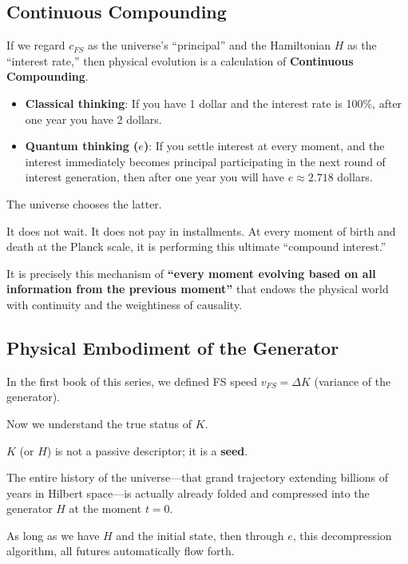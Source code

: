 \subsection{Continuous Compounding}

If we regard $c_{FS}$ as the universe's ``principal'' and the Hamiltonian $H$ as the ``interest rate,'' then physical evolution is a calculation of \textbf{Continuous Compounding}.

\begin{itemize}
\item \textbf{Classical thinking}: If you have 1 dollar and the interest rate is 100\%, after one year you have 2 dollars.

\item \textbf{Quantum thinking ($e$)}: If you settle interest at every moment, and the interest immediately becomes principal participating in the next round of interest generation, then after one year you will have $e \approx 2.718$ dollars.
\end{itemize}

The universe chooses the latter.

It does not wait. It does not pay in installments. At every moment of birth and death at the Planck scale, it is performing this ultimate ``compound interest.''

It is precisely this mechanism of \textbf{``every moment evolving based on all information from the previous moment''} that endows the physical world with continuity and the weightiness of causality.

\subsection{Physical Embodiment of the Generator}

In the first book of this series, we defined FS speed $v_{FS} = \Delta K$ (variance of the generator).

Now we understand the true status of $K$.

$K$ (or $H$) is not a passive descriptor; it is a \textbf{seed}.

The entire history of the universe---that grand trajectory extending billions of years in Hilbert space---is actually already folded and compressed into the generator $H$ at the moment $t=0$.

As long as we have $H$ and the initial state, then through \textbf{$e$}, this decompression algorithm, all futures automatically flow forth.

